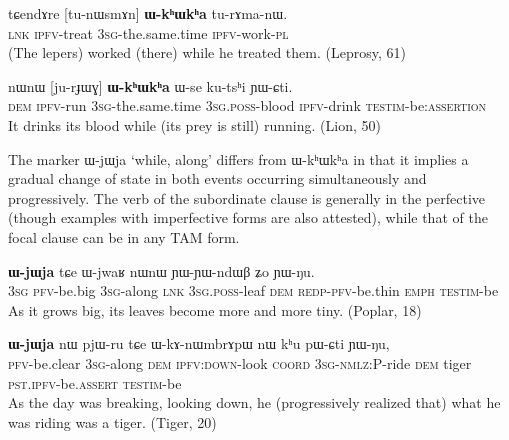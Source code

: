 \documentclass[oldfontcommands,oneside,a4paper,11pt]{article}
\newcommand{\ipa}[1]{{\phon \mbox{#1}}} %
\begin{document}
\begin{exe}
\ex \label{ex:WkhWkha1}
\gll
\ipa{tɕendɤre}  	[\ipa{tu-nɯsmɤn}]  	\textbf{\ipa{ɯ-kʰɯkʰa}}  	\ipa{tu-rɤma-nɯ.}  \\
\textsc{lnk} \textsc{ipfv}-treat \textsc{3sg}-the.same.time \textsc{ipfv}-work-\textsc{pl} \\
\glt (The lepers) worked (there) while he treated them. (Leprosy, 61)
\end{exe}
\begin{exe}
\ex \label{ex:WkhWkha2}
\gll
\ipa{nɯnɯ}  	[\ipa{ju-rɟɯɣ}]  	\textbf{\ipa{ɯ-kʰɯkʰa}}  	\ipa{ɯ-se}  	\ipa{ku-tsʰi}  	\ipa{ɲɯ-ɕti.}  \\
\textsc{dem} \textsc{ipfv}-run \textsc{3sg}-the.same.time \textsc{3sg.poss}-blood \textsc{ipfv}-drink  \textsc{testim}-be:\textsc{assertion} \\
\glt It drinks its blood while (its prey is still) running. (Lion, 50)
\end{exe}



The marker \ipa{ɯ-jɯja} `while, along'  differs from \ipa{ɯ-kʰɯkʰa} in that it implies a gradual change of state in both events occurring simultaneously and progressively. The verb of the subordinate clause is generally in the perfective (though examples with imperfective forms are also attested), while that of the focal clause can be in any TAM form.


\begin{exe}
\ex \label{ex:WjWja1}
\gll
[\ipa{ɯʑo}  	\ipa{tɤ-wxti}]  	\textbf{\ipa{ɯ-jɯja}}  	\ipa{tɕe}  	\ipa{ɯ-jwaʁ}  	\ipa{nɯnɯ}  	\ipa{ɲɯ-ɲɯ-ndɯβ}  	\ipa{ʑo}  	\ipa{ɲɯ-ŋu.}  	\\
\textsc{3sg} \textsc{pfv}-be.big  \textsc{3sg}-along \textsc{lnk} \textsc{3sg.poss}-leaf \textsc{dem} \textsc{redp-pfv}-be.thin \textsc{emph} \textsc{testim}-be \\
\glt As it grows big, its leaves become more and more tiny. (Poplar, 18)
\end{exe}

     \begin{exe}
   \ex \label{ex:khu}
   \gll  [\ipa{lɤ-fsoʁ}]  	\textbf{\ipa{ɯ-jɯja}}  	\ipa{nɯ}  	\ipa{pjɯ-ru}  	\ipa{tɕe}  	\ipa{ɯ-kɤ-nɯmbrɤpɯ}  	\ipa{nɯ}  	\ipa{kʰu}  	\ipa{pɯ-ɕti}  	\ipa{ɲɯ-ŋu,}  \\
\textsc{pfv}-be.clear    \textsc{3sg}-along  \textsc{dem} \textsc{ipfv:down}-look \textsc{coord} \textsc{3sg-nmlz:P}-ride \textsc{dem} tiger \textsc{pst.ipfv}-be.\textsc{assert}  \textsc{testim}-be \\
\glt As the day was breaking, looking down, he (progressively realized that) what he was riding was a tiger. (Tiger, 20)
\end{exe}
\end{document}
